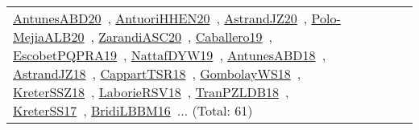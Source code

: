 {\begin{longtable}{lp{3cm}>{\raggedright\arraybackslash}p{6cm}>{\raggedright\arraybackslash}p{6cm}>{\raggedright\arraybackslash}p{8cm}}
\href{../works/AntunesABD20.pdf}{AntunesABD20}~\cite{AntunesABD20}, \href{../works/AntuoriHHEN20.pdf}{AntuoriHHEN20}~\cite{AntuoriHHEN20}, \href{../works/AstrandJZ20.pdf}{AstrandJZ20}~\cite{AstrandJZ20}, \href{../works/Polo-MejiaALB20.pdf}{Polo-MejiaALB20}~\cite{Polo-MejiaALB20}, \href{../works/ZarandiASC20.pdf}{ZarandiASC20}~\cite{ZarandiASC20}, \href{../works/Caballero19.pdf}{Caballero19}~\cite{Caballero19}, \href{../works/EscobetPQPRA19.pdf}{EscobetPQPRA19}~\cite{EscobetPQPRA19}, \href{../works/NattafDYW19.pdf}{NattafDYW19}~\cite{NattafDYW19}, \href{../works/AntunesABD18.pdf}{AntunesABD18}~\cite{AntunesABD18}, \href{../works/AstrandJZ18.pdf}{AstrandJZ18}~\cite{AstrandJZ18}, \href{../works/CappartTSR18.pdf}{CappartTSR18}~\cite{CappartTSR18}, \href{../works/GombolayWS18.pdf}{GombolayWS18}~\cite{GombolayWS18}, \href{../works/KreterSSZ18.pdf}{KreterSSZ18}~\cite{KreterSSZ18}, \href{../works/LaborieRSV18.pdf}{LaborieRSV18}~\cite{LaborieRSV18}, \href{../works/TranPZLDB18.pdf}{TranPZLDB18}~\cite{TranPZLDB18}, \href{../works/KreterSS17.pdf}{KreterSS17}~\cite{KreterSS17}, \href{../works/BridiLBBM16.pdf}{BridiLBBM16}~\cite{BridiLBBM16}... (Total: 61)\\

\end{longtable}}
